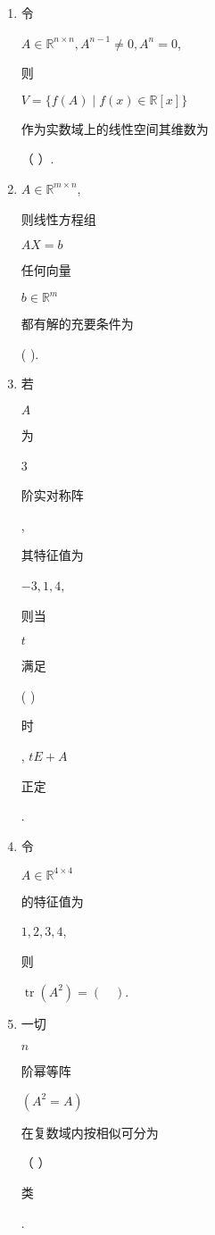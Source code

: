 \documentclass[10pt]{article}
\begin{document}
\begin{enumerate}
  \item \begin{CJK}{UTF8}{mj}令\end{CJK} $A \in \mathbb{R}^{n \times n}, A^{n-1} \neq 0, A^{n}=0$, \begin{CJK}{UTF8}{mj}则\end{CJK} $V=\{f(A) \mid f(x) \in \mathbb{R}[x]\}$ \begin{CJK}{UTF8}{mj}作为实数域上的线性空间其维数为\end{CJK}（ ）.

  \item $A \in \mathbb{R}^{m \times n}$, \begin{CJK}{UTF8}{mj}则线性方程组\end{CJK} $A X=b$ \begin{CJK}{UTF8}{mj}任何向量\end{CJK} $b \in \mathbb{R}^{m}$ \begin{CJK}{UTF8}{mj}都有解的充要条件为\end{CJK} ( ).

  \item \begin{CJK}{UTF8}{mj}若\end{CJK} $A$ \begin{CJK}{UTF8}{mj}为\end{CJK} 3 \begin{CJK}{UTF8}{mj}阶实对称阵\end{CJK}, \begin{CJK}{UTF8}{mj}其特征值为\end{CJK} $-3,1,4$, \begin{CJK}{UTF8}{mj}则当\end{CJK} $t$ \begin{CJK}{UTF8}{mj}满足\end{CJK} ( ) \begin{CJK}{UTF8}{mj}时\end{CJK}, $t E+A$ \begin{CJK}{UTF8}{mj}正定\end{CJK}.

  \item \begin{CJK}{UTF8}{mj}令\end{CJK} $A \in \mathbb{R}^{4 \times 4}$ \begin{CJK}{UTF8}{mj}的特征值为\end{CJK} $1,2,3,4$, \begin{CJK}{UTF8}{mj}则\end{CJK} $\operatorname{tr}\left(A^{2}\right)=(\quad)$.

  \item \begin{CJK}{UTF8}{mj}一切\end{CJK} $n$ \begin{CJK}{UTF8}{mj}阶幂等阵\end{CJK} $\left(A^{2}=A\right)$ \begin{CJK}{UTF8}{mj}在复数域内按相似可分为\end{CJK}（ $）$ \begin{CJK}{UTF8}{mj}类\end{CJK}.

\end{enumerate}
\end{document}
